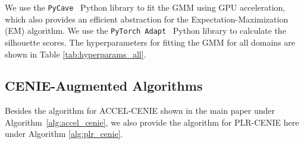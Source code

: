 We use the \texttt{PyCave}~\cite{pycave2022} Python library to fit the GMM using GPU acceleration, which also provides an efficient abstraction for the Expectation-Maximization (EM) algorithm. We use the \texttt{PyTorch Adapt}~\cite{Musgrave2022PyTorchA} Python library to calculate the silhouette scores. The hyperparameters for fitting the GMM for all domains are shown in Table \ref{tab:hyperparams_all}.

\subsection{CENIE-Augmented Algorithms}
Besides the algorithm for ACCEL-CENIE shown in the main paper under Algorithm~\ref{alg:accel_cenie}, we also provide the algorithm for PLR-CENIE here under Algorithm \ref{alg:plr_cenie}.

